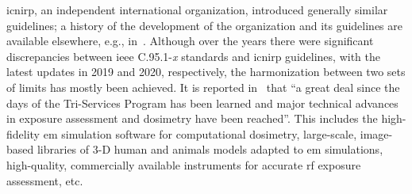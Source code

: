 \Gls{icnirp}, an independent international organization, introduced generally similar guidelines; a history of the development of the organization and its guidelines are available elsewhere, e.g., in~\cite{Repacholi2017history}.
Although over the years there were significant discrepancies between \gls{ieee} C.95.1-\textit{x} standards and \gls{icnirp} guidelines, with the latest updates in 2019 and 2020, respectively, the harmonization between two sets of limits has mostly been achieved.
It is reported in~\cite{Foster2022Three} that ``a great deal since the days of the Tri-Services Program has been learned and major technical advances in exposure assessment and dosimetry have been reached''.
This includes the high-fidelity \gls{em} simulation software for computational dosimetry, large-scale, image-based libraries of 3-D human and animals models adapted to \gls{em} simulations, high-quality, commercially available instruments for accurate \gls{rf} exposure assessment, etc.

